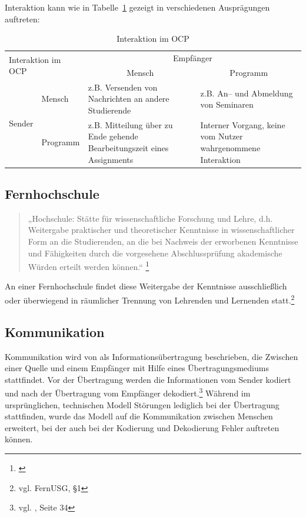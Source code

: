 Interaktion kann wie in Tabelle~\ref{tab:ocpinteractive} gezeigt in verschiedenen Ausprägungen auftreten:

\begin{table}[h]
\begin{tabular}{|l|l|m{4cm}|m{4cm}|}
\hline 
\multicolumn{2}{|l|}{\multirow{2}{*}{Interaktion im OCP}}                  & \multicolumn{2}{c|}{Empfänger}                                                                                 \\ \cline{3-4} 
\multicolumn{2}{|l|}{}                                   & \multicolumn{1}{c|}{Mensch}                                             & \multicolumn{1}{c|}{Programm}        \\ \hline
\multicolumn{1}{|c|}{\multirow{2}{*}{Sender}} & Mensch   & z.B. Versenden von Nachrichten an andere Studierende                    & z.B. An– und Abmeldung von Seminaren \\ \cline{2-4} 
\multicolumn{1}{|c|}{}                        & Programm & z.B. Mitteilung über zu Ende gehende Bearbeitungszeit eines Assignments & Interner Vorgang, keine vom Nutzer wahrgenommene Interaktion  \\ \hline
\end{tabular}
\caption{Interaktion im OCP}
\label{tab:ocpinteractive}
\end{table}


\subsection{Fernhochschule} %
\label{sub:hochschule}

\begin{quote}
„Hochschule: Stätte für wissenschaftliche Forschung und Lehre, d.h. Weitergabe praktischer und theoretischer Kenntnisse in wissenschaftlicher Form an die Studierenden, an die bei Nachweis der erworbenen Kenntnisse und Fähigkeiten durch die vorgesehene Abschlussprüfung akademische Würden erteilt werden können.“
\footnote{\cite{gabler:hochschule}}\end{quote}

An einer Fernhochschule findet diese Weitergabe der Kenntnisse ausschließlich oder überwiegend in räumlicher Trennung von Lehrenden und Lernenden statt.\footnote{vgl. FernUSG, §1}


\subsection{Kommunikation} %
\label{sub:kommunikation}
Kommunikation wird von \cite{shannonweaver} als Informationsübertragung beschrieben, die Zwischen einer Quelle  und einem Empfänger mit Hilfe eines Übertragungsmediums stattfindet. Vor der Übertragung werden die Informationen vom Sender kodiert und nach der Übertragung vom Empfänger dekodiert.\footnote{vgl. \cite{shannonweaver}, Seite 34} Während im ursprünglichen, technischen Modell Störungen lediglich bei der Übertragung stattfinden, wurde das Modell auf die Kommunikation zwischen Menschen erweitert, bei der auch bei der Kodierung und Dekodierung Fehler auftreten können.

